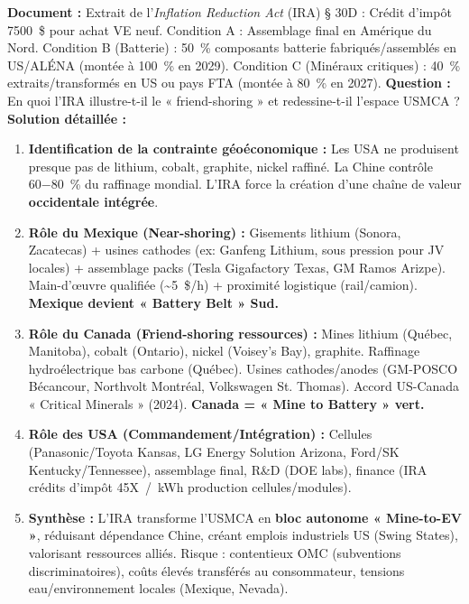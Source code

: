 \documentclass[11pt]{article}
\begin{document}
\begin{exoresolu}
\textbf{Document :} Extrait de l'\emph{Inflation Reduction Act} (IRA) § 30D : Crédit d'impôt \SI{7 500}{\$} pour achat VE neuf. Condition A : Assemblage final en Amérique du Nord. Condition B (Batterie) : \SI{50}{\%} composants batterie fabriqués/assemblés en US/ALÉNA (montée à \SI{100}{\%} en 2029). Condition C (Minéraux critiques) : \SI{40}{\%} extraits/transformés en US ou pays FTA (montée à \SI{80}{\%} en 2027).
\textbf{Question :} En quoi l'IRA illustre-t-il le « friend-shoring » et redessine-t-il l'espace USMCA ?
\textbf{Solution détaillée :}
\begin{enumerate}
\item \textbf{Identification de la contrainte géoéconomique :} Les USA ne produisent presque pas de lithium, cobalt, graphite, nickel raffiné. La Chine contrôle \SI{60-80}{\%} du raffinage mondial. L'IRA force la création d'une chaîne de valeur \textbf{occidentale intégrée}.
\item \textbf{Rôle du Mexique (Near-shoring) :} Gisements lithium (Sonora, Zacatecas) + usines cathodes (ex: Ganfeng Lithium, sous pression pour JV locales) + assemblage packs (Tesla Gigafactory Texas, GM Ramos Arizpe). Main-d'œuvre qualifiée (\SI{~5}{\$}/h) + proximité logistique (rail/camion). \rightarrow \textbf{Mexique devient « Battery Belt » Sud.}
\item \textbf{Rôle du Canada (Friend-shoring ressources) :} Mines lithium (Québec, Manitoba), cobalt (Ontario), nickel (Voisey's Bay), graphite. Raffinage hydroélectrique bas carbone (Québec). Usines cathodes/anodes (GM-POSCO Bécancour, Northvolt Montréal, Volkswagen St. Thomas). Accord US-Canada « Critical Minerals » (2024). \rightarrow \textbf{Canada = « Mine to Battery » vert.}
\item \textbf{Rôle des USA (Commandement/Intégration) :} Cellules (Panasonic/Toyota Kansas, LG Energy Solution Arizona, Ford/SK Kentucky/Tennessee), assemblage final, R\&D (DOE labs), finance (IRA crédits d'impôt \SI{45X}{/kWh} production cellules/modules).
\item \textbf{Synthèse :} L'IRA transforme l'USMCA en \textbf{bloc autonome « Mine-to-EV »}, réduisant dépendance Chine, créant emplois industriels US (Swing States), valorisant ressources alliés. Risque : contentieux OMC (subventions discriminatoires), coûts élevés transférés au consommateur, tensions eau/environnement locales (Mexique, Nevada).
\end{enumerate}
\end{exoresolu}
\end{document}
